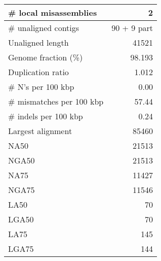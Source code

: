 \documentclass[12pt,a4paper]{article}
\begin{document}
\begin{table}[ht]
\begin{center}
\begin{tabular}{|l*{1}{|r}|}
\# local misassemblies & 2 \\ \hline
\# unaligned contigs & 90 + 9 part \\ \hline
Unaligned length & 41521 \\ \hline
Genome fraction (\%) & 98.193 \\ \hline
Duplication ratio & 1.012 \\ \hline
\# N's per 100 kbp & 0.00 \\ \hline
\# mismatches per 100 kbp & 57.44 \\ \hline
\# indels per 100 kbp & 0.24 \\ \hline
Largest alignment & 85460 \\ \hline
NA50 & 21513 \\ \hline
NGA50 & 21513 \\ \hline
NA75 & 11427 \\ \hline
NGA75 & 11546 \\ \hline
LA50 & 70 \\ \hline
LGA50 & 70 \\ \hline
LA75 & 145 \\ \hline
LGA75 & 144 \\ \hline
\end{tabular}
\end{center}
\end{table}
\end{document}
